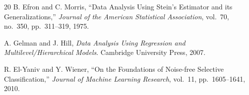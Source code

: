 \documentclass[conference]{IEEEtran}
\begin{document}
\begin{thebibliography}{20}
B. Efron and C. Morris, ``Data Analysis Using Stein's Estimator and
its Generalizations,'' \textit{Journal of the American Statistical
Association}, vol.~70, no.~350, pp.~311--319, 1975.

A. Gelman and J. Hill, \textit{Data Analysis Using Regression and
Multilevel/Hierarchical Models}. Cambridge University Press, 2007.

R. El-Yaniv and Y. Wiener, ``On the Foundations of Noise-free
Selective Classification,'' \textit{Journal of Machine Learning
Research}, vol.~11, pp.~1605--1641, 2010.

\end{thebibliography}
\end{document}

